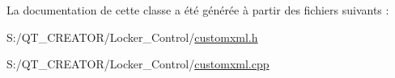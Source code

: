 La documentation de cette classe a été générée à partir des fichiers suivants \+:\begin{DoxyCompactItemize}
\item 
S\+:/\+Q\+T\+\_\+\+C\+R\+E\+A\+T\+O\+R/\+Locker\+\_\+\+Control/\hyperlink{customxml_8h}{customxml.\+h}\item 
S\+:/\+Q\+T\+\_\+\+C\+R\+E\+A\+T\+O\+R/\+Locker\+\_\+\+Control/\hyperlink{customxml_8cpp}{customxml.\+cpp}\end{DoxyCompactItemize}
